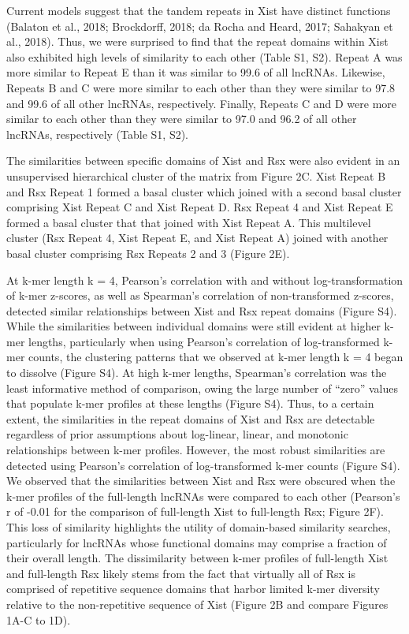 Current models suggest that the tandem repeats in Xist have distinct functions (Balaton et al., 2018; Brockdorff, 2018; da Rocha and Heard, 2017; Sahakyan et al., 2018). Thus, we were surprised to find that the repeat domains within Xist also exhibited high levels of similarity to each other (Table S1, S2). Repeat A was more similar to Repeat E than it was similar to 99.6 of all lncRNAs. Likewise, Repeats B and C were more similar to each other than they were similar to 97.8 and 99.6 of all other lncRNAs, respectively. Finally, Repeats C and D were more similar to each other than they were similar to 97.0 and 96.2 of all other lncRNAs, respectively (Table S1, S2). 

The similarities between specific domains of Xist and Rsx were also evident in an unsupervised hierarchical cluster of the matrix from Figure 2C. Xist Repeat B and Rsx Repeat 1 formed a basal cluster which joined with a second basal cluster comprising Xist Repeat C and Xist Repeat D.   Rsx Repeat 4 and Xist Repeat E formed a basal cluster that that joined with Xist Repeat A. This multilevel cluster (Rsx Repeat 4, Xist Repeat E, and Xist Repeat A) joined with another basal cluster comprising Rsx Repeats 2 and 3 (Figure 2E). 

At k-mer length k = 4, Pearson’s correlation with and without log-transformation of k-mer z-scores, as well as Spearman’s correlation of non-transformed z-scores, detected similar relationships between Xist and Rsx repeat domains (Figure S4). While the similarities between individual domains were still evident at higher k-mer lengths, particularly when using Pearson’s correlation of log-transformed k-mer counts, the clustering patterns that we observed at k-mer length k = 4 began to dissolve (Figure S4). At high k-mer lengths, Spearman’s correlation was the least informative method of comparison, owing the large number of “zero” values that populate k-mer profiles at these lengths (Figure S4). Thus, to a certain extent, the similarities in the repeat domains of Xist and Rsx are detectable regardless of prior assumptions about log-linear, linear, and monotonic relationships between k-mer profiles. However, the most robust similarities are detected using Pearson’s correlation of log-transformed k-mer counts (Figure S4).
We observed that the similarities between Xist and Rsx were obscured when the k-mer profiles of the full-length lncRNAs were compared to each other (Pearson’s r of -0.01 for the comparison of full-length Xist to full-length Rsx; Figure 2F). This loss of similarity highlights the utility of domain-based similarity searches, particularly for lncRNAs whose functional domains may comprise a fraction of their overall length. The dissimilarity between k-mer profiles of full-length Xist and full-length Rsx likely stems from the fact that virtually all of Rsx is comprised of repetitive sequence domains that harbor limited k-mer diversity relative to the non-repetitive sequence of Xist (Figure 2B and compare Figures 1A-C to 1D). 

